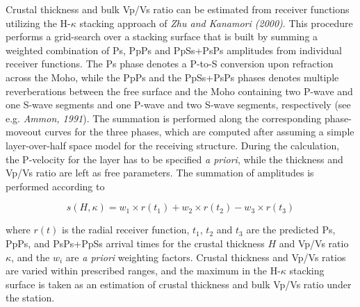 \documentclass[manuscript,11pt]{geophysics}
\begin{document}
Crustal thickness and bulk Vp/Vs ratio can be estimated from receiver functions utilizing the H-$\kappa$ stacking approach of \textit{Zhu and Kanamori (2000)}. This procedure performs a grid-search over a stacking surface that is built by summing a weighted combination of Ps, PpPs and PpSs+PsPs amplitudes from individual receiver functions. The Ps phase denotes a P-to-S conversion upon refraction across the Moho, while the PpPs and the PpSs+PsPs phases denotes multiple reverberations between the free surface and the Moho containing two P-wave and one S-wave segments and one P-wave and two S-wave segments, respectively (see e.g. \textit{Ammon, 1991}). The summation is performed along the corresponding phase-moveout curves for the three phases, which are computed after assuming a simple layer-over-half space model for the receiving structure. During the calculation, the P-velocity for the layer has to be specified \textit{a priori}, while the thickness and Vp/Vs ratio are left as free parameters. The summation of amplitudes is performed according to

\begin{linenomath*}
\begin{equation}
s(H,\kappa) = w_{1} \times r(t_{1}) + w_{2} \times r(t_{2}) - w_{3} \times r(t_{3})
\end{equation}
\end{linenomath*}

\noindent where $r(t)$ is the radial receiver function, $t_1$, $t_2$ and $t_3$ are the predicted Ps, PpPs, and PsPs+PpSs arrival times for the crustal thickness $H$ and  Vp/Vs ratio $\kappa$, and the $w_{i}$ are \textit{a priori} weighting factors. Crustal thickness and Vp/Vs ratios are varied within prescribed ranges, and the maximum in the H-$\kappa$ stacking surface is taken as an estimation of crustal thickness and bulk Vp/Vs ratio under the station.
\end{document}
